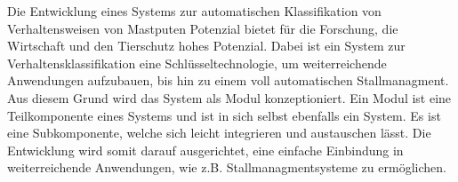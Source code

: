 Die Entwicklung eines Systems zur automatischen Klassifikation von Verhaltensweisen von Mastputen Potenzial bietet für die Forschung, die Wirtschaft und den Tierschutz hohes Potenzial. Dabei ist ein System zur Verhaltensklassifikation eine Schlüsseltechnologie, um weiterreichende Anwendungen aufzubauen, bis hin zu einem voll automatischen Stallmanagment. Aus diesem Grund wird das System als Modul konzeptioniert. Ein Modul ist eine Teilkomponente eines Systems und ist in sich selbst ebenfalls ein \gls{System}. Es ist eine Subkomponente, welche sich leicht integrieren und austauschen lässt. Die Entwicklung wird somit darauf ausgerichtet, eine einfache Einbindung in weiterreichende Anwendungen, wie z.B. Stallmanagmentsysteme zu ermöglichen. 